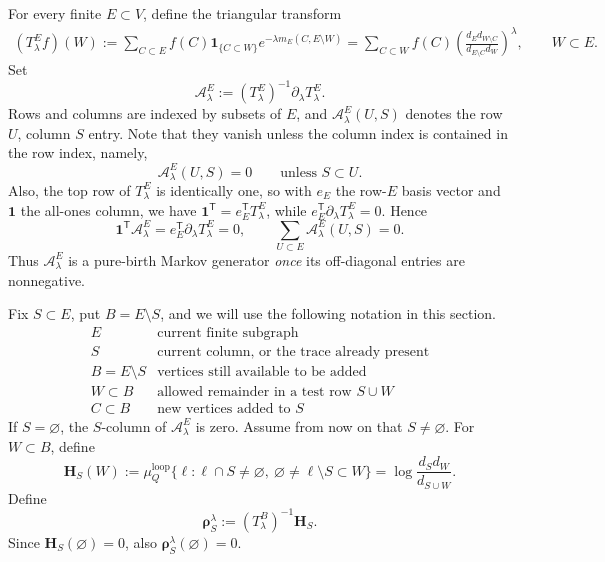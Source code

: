 \documentclass[11pt]{article}
\numberwithin{equation}{section}
\newcommand{\1}{\mathbf{1}}
\newcommand{\one}{\mathbf 1}
\newcommand{\Loop}{\mu^{\mathrm{loop}}}
\newcommand{\Ac}{\mathcal A}
\newcommand{\bH}{\mathbf H}
\newcommand{\brho}{\boldsymbol{\rho}}
\begin{document}
For every finite \(E\subset V\), define the triangular transform
\begin{align}\label{eq:finite-transform-local}
 (T_\lambda^Ef)(W)
 :=\sum_{C\subset E}f(C)\one_{\{C\subset W\}}
       e^{-\lambda m_E(C,E\setminus W)}=\sum_{C\subset W}f(C)
   \left(\frac{d_Ed_{W\setminus C}}
   {d_{E\setminus C}d_W}\right)^\lambda,
 \qquad W\subset E.
\end{align}
Set
\begin{equation}\label{eq:A-generator}
        \Ac_\lambda^E:=(T_\lambda^E)^{-1}\partial_\lambda T_\lambda^E .
\end{equation}
Rows and columns are indexed by subsets of \(E\), and
\(\Ac_\lambda^E(U,S)\) denotes the row \(U\), column \(S\) entry.  Note that they vanish unless the column index is contained in the row index, namely,
\begin{equation}\label{eq:A-incidence}
        \Ac_\lambda^E(U,S)=0\qquad\text{unless }S\subset U .
\end{equation}
Also, the top row of \(T_\lambda^E\) is identically one, so with \(e_E\)
the row-\(E\) basis vector and \(\one\) the all-ones column, we have \(\one^{\mathsf T}=e_E^{\mathsf T}T_\lambda^E\), while
\(e_E^{\mathsf T}\partial_\lambda T_\lambda^E=0\).  Hence
\begin{equation}\label{eq:column-sum-zero}
 \one^{\mathsf T}\Ac_\lambda^E
 =e_E^{\mathsf T}\partial_\lambda T_\lambda^E=0,
 \qquad
 \sum_{U\subset E}\Ac_\lambda^E(U,S)=0 .
\end{equation}
Thus \(\Ac_\lambda^E\) is a pure-birth Markov generator \emph{once} its off-diagonal
entries are nonnegative.

Fix \(S\subset E\), put \(B=E\setminus S\), and we will use the following notation in this section.
\[
\begin{array}{c|l}
E & \text{current finite subgraph} \\
S & \text{current column, or the trace already present} \\
B=E\setminus S & \text{vertices still available to be added} \\
W\subset B & \text{allowed remainder in a test row }S\cup W \\
C\subset B & \text{new vertices added to }S
\end{array}
\]
If \(S=\varnothing\), the \(S\)-column of \(\Ac_\lambda^E\) is zero.  Assume
from now on that \(S\ne\varnothing\).  For \(W\subset B\), define
\begin{equation}\label{eq:HS}
        \bH_S(W):=
        \Loop_Q\{\ell:\ell\cap S\ne\varnothing,
        \ \varnothing\ne\ell\setminus S\subset W\}
        =\log\frac{d_Sd_W}{d_{S\cup W}} .
\end{equation}
Define
\begin{equation}\label{eq:rho}
        \brho_S^\lambda:=(T_\lambda^B)^{-1}\bH_S .
\end{equation}
Since \(\bH_S(\varnothing)=0\), also \(\brho_S^\lambda(\varnothing)=0\).
\end{document}

